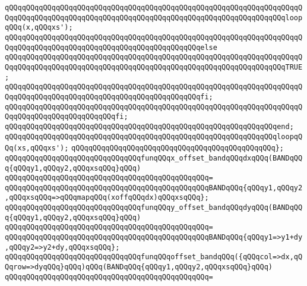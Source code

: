 \newline
\verb|qQQqqQQqqQQqqQQqqQQqqQQqqQQqqQQqqQQqqQQqqQQqqQQqqQQqqQQqqQQqqQQqqQQqqQQqqQQqqQQqqQQqqQQqqQQqqQQqqQQqqQQqqQQqqQQqqQQqqQQqqQQqqQQqqQQqqQQqloopqQQq(x,qQQqxs');|\newline
\verb|qQQqqQQqqQQqqQQqqQQqqQQqqQQqqQQqqQQqqQQqqQQqqQQqqQQqqQQqqQQqqQQqqQQqqQQqqQQqqQQqqQQqqQQqqQQqqQQqqQQqqQQqqQQqqQQqqQQqelse|\newline
\verb|qQQqqQQqqQQqqQQqqQQqqQQqqQQqqQQqqQQqqQQqqQQqqQQqqQQqqQQqqQQqqQQqqQQqqQQqqQQqqQQqqQQqqQQqqQQqqQQqqQQqqQQqqQQqqQQqqQQqqQQqqQQqqQQqqQQqqQQqTRUE;|\newline
\verb|qQQqqQQqqQQqqQQqqQQqqQQqqQQqqQQqqQQqqQQqqQQqqQQqqQQqqQQqqQQqqQQqqQQqqQQqqQQqqQQqqQQqqQQqqQQqqQQqqQQqqQQqqQQqqQQqqQQqfi;|\newline
\verb|qQQqqQQqqQQqqQQqqQQqqQQqqQQqqQQqqQQqqQQqqQQqqQQqqQQqqQQqqQQqqQQqqQQqqQQqqQQqqQQqqQQqqQQqqQQqqQQqfi;|\newline
\verb|qQQqqQQqqQQqqQQqqQQqqQQqqQQqqQQqqQQqqQQqqQQqqQQqqQQqqQQqqQQqqQQqend;|\newline
\newline
\verb|qQQqqQQqqQQqqQQqqQQqqQQqqQQqqQQqqQQqqQQqqQQqqQQqqQQqqQQqqQQqqQQqloopqQQq(xs,qQQqxs');|\newline
\verb|qQQqqQQqqQQqqQQqqQQqqQQqqQQqqQQqqQQqqQQqqQQqqQQq};|\newline
\newline
\verb|qQQqqQQqqQQqqQQqqQQqqQQqqQQqqQQqfunqQQqx_offset_bandqQQqdxqQQq(BANDqQQq{qQQqy1,qQQqy2,qQQqxsqQQq}qQQq)|\newline
\verb|qQQqqQQqqQQqqQQqqQQqqQQqqQQqqQQqqQQqqQQqqQQqqQQq=|\newline
\verb|qQQqqQQqqQQqqQQqqQQqqQQqqQQqqQQqqQQqqQQqqQQqqQQqBANDqQQq{qQQqy1,qQQqy2,qQQqxsqQQq=>qQQqmapqQQq(xoffqQQqdx)qQQqxsqQQq};|\newline
\newline
\verb|qQQqqQQqqQQqqQQqqQQqqQQqqQQqqQQqfunqQQqy_offset_bandqQQqdyqQQq(BANDqQQq{qQQqy1,qQQqy2,qQQqxsqQQq}qQQq)|\newline
\verb|qQQqqQQqqQQqqQQqqQQqqQQqqQQqqQQqqQQqqQQqqQQqqQQq=|\newline
\verb|qQQqqQQqqQQqqQQqqQQqqQQqqQQqqQQqqQQqqQQqqQQqqQQqBANDqQQq{qQQqy1=>y1+dy,qQQqy2=>y2+dy,qQQqxsqQQq};|\newline
\newline
\verb|qQQqqQQqqQQqqQQqqQQqqQQqqQQqqQQqfunqQQqoffset_bandqQQq({qQQqcol=>dx,qQQqrow=>dyqQQq}qQQq)qQQq(BANDqQQq{qQQqy1,qQQqy2,qQQqxsqQQq}qQQq)|\newline
\verb|qQQqqQQqqQQqqQQqqQQqqQQqqQQqqQQqqQQqqQQqqQQqqQQq=|\newline
